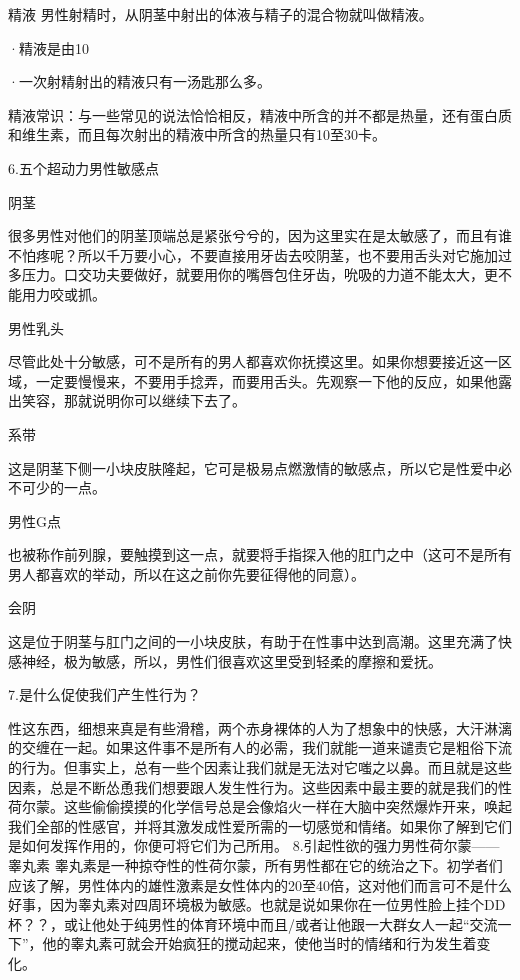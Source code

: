 \documentclass[12pt,UTF8,openany]{ctexbook}
\begin{document}
精液
男性射精时，从阴茎中射出的体液与精子的混合物就叫做精液。

·精液是由10%

·一次射精射出的精液只有一汤匙那么多。

精液常识：与一些常见的说法恰恰相反，精液中所含的并不都是热量，还有蛋白质和维生素，而且每次射出的精液中所含的热量只有10至30卡。

6.五个超动力男性敏感点

阴茎

很多男性对他们的阴茎顶端总是紧张兮兮的，因为这里实在是太敏感了，而且有谁不怕疼呢？所以千万要小心，不要直接用牙齿去咬阴茎，也不要用舌头对它施加过多压力。口交功夫要做好，就要用你的嘴唇包住牙齿，吮吸的力道不能太大，更不能用力咬或抓。

男性乳头

尽管此处十分敏感，可不是所有的男人都喜欢你抚摸这里。如果你想要接近这一区域，一定要慢慢来，不要用手捻弄，而要用舌头。先观察一下他的反应，如果他露出笑容，那就说明你可以继续下去了。

系带

这是阴茎下侧一小块皮肤隆起，它可是极易点燃激情的敏感点，所以它是性爱中必不可少的一点。

男性G点

也被称作前列腺，要触摸到这一点，就要将手指探入他的肛门之中（这可不是所有男人都喜欢的举动，所以在这之前你先要征得他的同意）。

会阴

这是位于阴茎与肛门之间的一小块皮肤，有助于在性事中达到高潮。这里充满了快感神经，极为敏感，所以，男性们很喜欢这里受到轻柔的摩擦和爱抚。

7.是什么促使我们产生性行为？

性这东西，细想来真是有些滑稽，两个赤身裸体的人为了想象中的快感，大汗淋漓的交缠在一起。如果这件事不是所有人的必需，我们就能一道来谴责它是粗俗下流的行为。但事实上，总有一些个因素让我们就是无法对它嗤之以鼻。而且就是这些因素，总是不断怂恿我们想要跟人发生性行为。这些因素中最主要的就是我们的性荷尔蒙。这些偷偷摸摸的化学信号总是会像焰火一样在大脑中突然爆炸开来，唤起我们全部的性感官，并将其激发成性爱所需的一切感觉和情绪。如果你了解到它们是如何发挥作用的，你便可将它们为己所用。
8.引起性欲的强力男性荷尔蒙——睾丸素
睾丸素是一种掠夺性的性荷尔蒙，所有男性都在它的统治之下。初学者们应该了解，男性体内的雄性激素是女性体内的20至40倍，这对他们而言可不是什么好事，因为睾丸素对四周环境极为敏感。也就是说如果你在一位男性脸上挂个DD杯？？，或让他处于纯男性的体育环境中而且/或者让他跟一大群女人一起“交流一下”，他的睾丸素可就会开始疯狂的搅动起来，使他当时的情绪和行为发生着变化。
\end{document}
